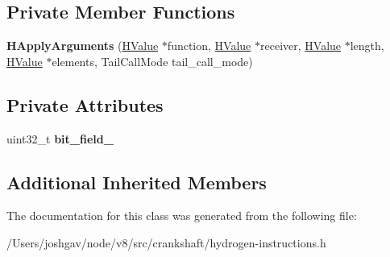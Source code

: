 \subsection*{Private Member Functions}
\begin{DoxyCompactItemize}
\item 
{\bfseries H\+Apply\+Arguments} (\hyperlink{classv8_1_1internal_1_1_h_value}{H\+Value} $\ast$function, \hyperlink{classv8_1_1internal_1_1_h_value}{H\+Value} $\ast$receiver, \hyperlink{classv8_1_1internal_1_1_h_value}{H\+Value} $\ast$length, \hyperlink{classv8_1_1internal_1_1_h_value}{H\+Value} $\ast$elements, Tail\+Call\+Mode tail\+\_\+call\+\_\+mode)\hypertarget{classv8_1_1internal_1_1_h_apply_arguments_a93c5194cc5a0bf18885cf7d7ee725cad}{}\label{classv8_1_1internal_1_1_h_apply_arguments_a93c5194cc5a0bf18885cf7d7ee725cad}

\end{DoxyCompactItemize}
\subsection*{Private Attributes}
\begin{DoxyCompactItemize}
\item 
uint32\+\_\+t {\bfseries bit\+\_\+field\+\_\+}\hypertarget{classv8_1_1internal_1_1_h_apply_arguments_ad3fd341d43beea88c5cbe79dde743196}{}\label{classv8_1_1internal_1_1_h_apply_arguments_ad3fd341d43beea88c5cbe79dde743196}

\end{DoxyCompactItemize}
\subsection*{Additional Inherited Members}


The documentation for this class was generated from the following file\+:\begin{DoxyCompactItemize}
\item 
/\+Users/joshgav/node/v8/src/crankshaft/hydrogen-\/instructions.\+h\end{DoxyCompactItemize}
